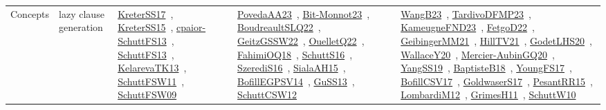 {\begin{longtable}{lp{3cm}>{\raggedright\arraybackslash}p{6cm}>{\raggedright\arraybackslash}p{6cm}>{\raggedright\arraybackslash}p{8cm}}
Concepts & lazy clause generation & \href{articles/KreterSS17.pdf}{KreterSS17}~\cite{KreterSS17}, \href{papers/KreterSS15.pdf}{KreterSS15}~\cite{KreterSS15}, \href{papers/cpaior-SchuttFS13.pdf}{cpaior-SchuttFS13}~\cite{cpaior-SchuttFS13}, \href{papers/SchuttFS13.pdf}{SchuttFS13}~\cite{SchuttFS13}, \href{papers/KelarevaTK13.pdf}{KelarevaTK13}~\cite{KelarevaTK13}, \href{articles/SchuttFSW11.pdf}{SchuttFSW11}~\cite{SchuttFSW11}, \href{papers/SchuttFSW09.pdf}{SchuttFSW09}~\cite{SchuttFSW09} & \href{papers/PovedaAA23.pdf}{PovedaAA23}~\cite{PovedaAA23}, \href{papers/Bit-Monnot23.pdf}{Bit-Monnot23}~\cite{Bit-Monnot23}, \href{papers/BoudreaultSLQ22.pdf}{BoudreaultSLQ22}~\cite{BoudreaultSLQ22}, \href{papers/GeitzGSSW22.pdf}{GeitzGSSW22}~\cite{GeitzGSSW22}, \href{papers/OuelletQ22.pdf}{OuelletQ22}~\cite{OuelletQ22}, \href{articles/FahimiOQ18.pdf}{FahimiOQ18}~\cite{FahimiOQ18}, \href{papers/SchuttS16.pdf}{SchuttS16}~\cite{SchuttS16}, \href{papers/SzerediS16.pdf}{SzerediS16}~\cite{SzerediS16}, \href{papers/SialaAH15.pdf}{SialaAH15}~\cite{SialaAH15}, \href{papers/BofillEGPSV14.pdf}{BofillEGPSV14}~\cite{BofillEGPSV14}, \href{papers/GuSS13.pdf}{GuSS13}~\cite{GuSS13}, \href{papers/SchuttCSW12.pdf}{SchuttCSW12}~\cite{SchuttCSW12} & \href{papers/WangB23.pdf}{WangB23}~\cite{WangB23}, \href{papers/TardivoDFMP23.pdf}{TardivoDFMP23}~\cite{TardivoDFMP23}, \href{papers/KameugneFND23.pdf}{KameugneFND23}~\cite{KameugneFND23}, \href{articles/FetgoD22.pdf}{FetgoD22}~\cite{FetgoD22}, \href{papers/GeibingerMM21.pdf}{GeibingerMM21}~\cite{GeibingerMM21}, \href{papers/HillTV21.pdf}{HillTV21}~\cite{HillTV21}, \href{papers/GodetLHS20.pdf}{GodetLHS20}~\cite{GodetLHS20}, \href{articles/WallaceY20.pdf}{WallaceY20}~\cite{WallaceY20}, \href{papers/Mercier-AubinGQ20.pdf}{Mercier-AubinGQ20}~\cite{Mercier-AubinGQ20}, \href{papers/YangSS19.pdf}{YangSS19}~\cite{YangSS19}, \href{articles/BaptisteB18.pdf}{BaptisteB18}~\cite{BaptisteB18}, \href{papers/YoungFS17.pdf}{YoungFS17}~\cite{YoungFS17}, \href{papers/BofillCSV17.pdf}{BofillCSV17}~\cite{BofillCSV17}, \href{papers/GoldwaserS17.pdf}{GoldwaserS17}~\cite{GoldwaserS17}, \href{papers/PesantRR15.pdf}{PesantRR15}~\cite{PesantRR15}, \href{articles/LombardiM12.pdf}{LombardiM12}~\cite{LombardiM12}, \href{papers/GrimesH11.pdf}{GrimesH11}~\cite{GrimesH11}, \href{papers/SchuttW10.pdf}{SchuttW10}~\cite{SchuttW10}\\

\end{longtable}}
